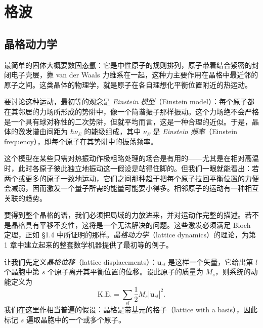

\chapter{格波}


\section{晶格动力学}

最简单的固体大概要数固态氩：它是中性原子的规则排列，原子带着结合紧密的封闭电子壳层，靠 van der Waals 力维系在一起，这种力主要作用在晶格中最近邻的原子之间。这类晶体的物理学，就是原子在各自理想化平衡位置附近的热运动。

要讨论这种运动，最初等的观念是 \emph{Einstein 模型}（Einstein model）：每个原子都在其邻居的力场所形成的势阱中，像一个简谐振子那样振动。这个力场绝不会严格是一个具有球对称性的二次势阱，但就平均而言，这是一种合理的近似。于是，晶体的激发谱由间距为 $\hbar\nu_E$ 的能级组成，其中 $\nu_E$ 是 \emph{Einstein 频率}（Einstein frequency），即每个原子在其势阱中的振荡频率。

这个模型在某些只需对热振动作极粗略处理的场合是有用的——尤其是在相对高温时，此时各原子彼此独立地振动这一假设是站得住脚的。但我们一眼就能看出：若两个或更多的原子一致地运动，它们之间那种趋于把每个原子拉回平衡位置的力便会减弱，因而激发一个量子所需的能量可能要小得多。相邻原子的运动有一种相互关联的趋势。

要得到整个晶格的谱，我们必须把局域的力放进来，并对运动作完整的描述。若不是晶格具有平移不变性，这将是一个无法解决的问题。这些激发必须满足 Bloch 定理，正如 §1.4 中所证明的那样。\emph{晶格动力学}（lattice dynamics）的理论，为第 1 章中建立起来的整套数学机器提供了最初等的例子。

让我们先定义\emph{晶格位移}（lattice displacements）：$\mathbf{u}_{sl}$ 是这样一个矢量，它给出第 $l$ 个晶胞中第 $s$ 个原子离开其平衡位置的位移。设此原子的质量为 $M_s$，则系统的动能定义为
\begin{equation*}
\text{K.E.} = \sum_{sl} \frac{1}{2} M_s \left| \dot{\mathbf{u}}_{sl} \right|^2.
\tag{2.1}
\end{equation*}
我们在这里作相当普遍的假设：晶格是带基元的格子（lattice with a basis），因此标记 $s$ 遍取晶胞中的一个或多个原子。

